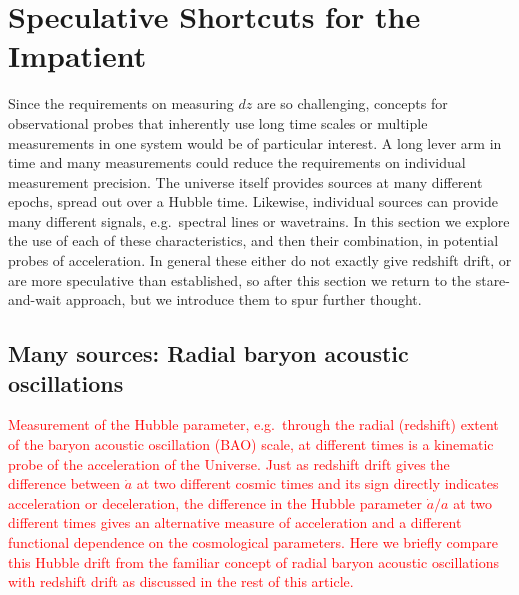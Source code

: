 \documentclass[preprint2, 10pt]{aastex}
\begin{document}
\section{Speculative Shortcuts for the Impatient} \label{sec:methods} 

Since the requirements on measuring $dz$ are so challenging, 
concepts for observational probes that inherently use long time scales or 
multiple measurements in one system would be of particular interest. 
A long lever arm in time and many measurements could reduce the requirements 
on individual measurement precision.  The universe itself provides sources 
at many different epochs, spread out over a Hubble time.  Likewise, 
individual sources can provide many different signals, e.g.\ spectral lines 
or wavetrains.  In this section we explore the use of each of these 
characteristics, and then their combination, in potential probes of 
acceleration. In general these either do not exactly give redshift drift, 
or are more speculative than established, so after this section we return 
to the stare-and-wait approach, but we introduce them to spur further thought. 


\subsection{Many sources: Radial baryon acoustic oscillations} \label{sec:rbao} 
\textcolor{red}{Measurement of the Hubble parameter, e.g.\ through the radial 
(redshift) extent of the baryon acoustic oscillation (BAO) scale, 
at different times is a kinematic
probe of the acceleration of the Universe. Just as redshift drift gives the difference
between $\dot{a}$ at two different cosmic times and its sign directly indicates
acceleration or deceleration, the difference in the Hubble parameter $\dot{a}/a$
at two different times gives an alternative measure of acceleration
and a different functional dependence on the cosmological parameters.
Here we briefly compare this Hubble drift from the 
familiar concept of radial baryon acoustic oscillations 
with redshift drift as discussed in the rest of this article.} 
\end{document}
